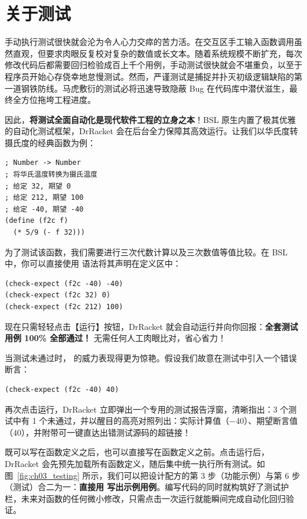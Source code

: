 \section{关于测试}
\label{sec:3.5}

手动执行测试很快就会沦为令人心力交瘁的苦力活。在交互区手工输入函数调用虽然直观，但要求肉眼反复校对复杂的数值或长文本。随着系统规模不断扩充，每次修改代码后都需要回归检验成百上千个用例，手动测试很快就会不堪重负，以至于程序员开始心存侥幸地怠慢测试。然而，严谨测试是捕捉并扑灭初级逻辑缺陷的第一道钢铁防线。马虎敷衍的测试必将迅速导致隐蔽 Bug 在代码库中潜伏滋生，最终全方位拖垮工程进度。

因此，\textbf{将测试全面自动化是现代软件工程的立身之本}！BSL 原生内置了极其优雅的自动化测试框架，DrRacket 会在后台全力保障其高效运行。让我们以华氏度转摄氏度的经典函数为例：
\begin{lstlisting}[language=BSL]
; Number -> Number
; 将华氏温度转换为摄氏温度
; 给定 32, 期望 0
; 给定 212, 期望 100
; 给定 -40, 期望 -40
(define (f2c f)
  (* 5/9 (- f 32)))
\end{lstlisting}

为了测试该函数，我们需要进行三次代数计算以及三次数值等值比较。在 BSL 中，你可以直接使用  语法将其声明在定义区中：
\begin{lstlisting}[language=BSL]
(check-expect (f2c -40) -40)
(check-expect (f2c 32) 0)
(check-expect (f2c 212) 100)
\end{lstlisting}

现在只需轻轻点击【运行】按钮，DrRacket 就会自动运行并向你回报：\textbf{全套测试用例 100\% 全部通过！} 无需任何人工肉眼比对，省心省力！

当测试未通过时， 的威力表现得更为惊艳。假设我们故意在测试中引入一个错误断言：
\begin{lstlisting}[language=BSL]
(check-expect (f2c -40) 40)
\end{lstlisting}
再次点击运行，DrRacket 立即弹出一个专用的测试报告浮窗，清晰指出：3 个测试中有 1 个未通过，并以醒目的高亮对照列出：实际计算值（$-40$）、期望断言值（$40$），并附带可一键直达出错测试源码的超链接！

 既可以写在函数定义之后，也可以直接写在函数定义之前。点击运行后，DrRacket 会先预先加载所有函数定义，随后集中统一执行所有测试。如图~\ref{fig:ch03_testing} 所示，我们可以把设计配方的第 3 步（功能示例）与第 6 步（测试）合二为一：\textbf{直接用  写出示例用例}。编写代码的同时就构筑好了测试护栏，未来对函数的任何微小修改，只需点击一次运行就能瞬间完成自动化回归验证。

